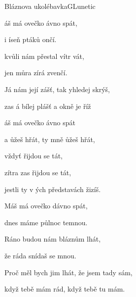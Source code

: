\begin{song}{Bláznova ukolébavka}{G}{Lunetic}

\begin{SBVerse}

áš má ovečko ávno spát,

i íseň ptáků ončí.

kvůli nám přestal vítr vát,

jen můra zírá zvenčí.

Já nám její zášť, tak yhledej skrýš,

zas á bílej plášť a  okně je říž

\end{SBVerse}

\begin{SBChorus}

áš má ovečko ávno spát

a ůžeš hřát, ty mně ůžeš hřát,

vždyť řijdou se tát,

zítra zas řijdou se tát,

jestli ty v ých představách žizíš.

\end{SBChorus}

\begin{SBVerse}

Máš má ovečko dávno spát,

dnes máme půlnoc temnou.

Ráno budou nám bláznům lhát,

že ráda snídaš se mnou.

Proč měl bych jim lhát, že jsem tady sám,

když tebě mám rád, když tebě tu mám.

\end{SBVerse}

\begin{SBChorus}

\end{SBChorus}

\end{song}

\clearpage
